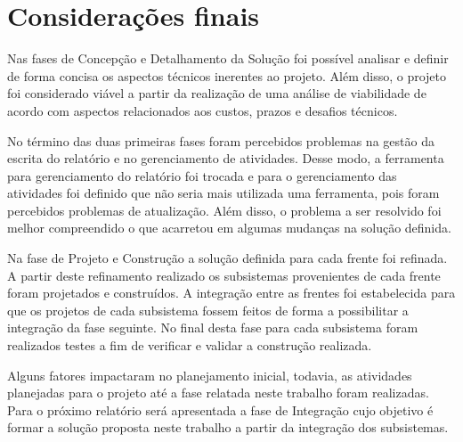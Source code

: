 \chapter{Considerações finais}




Nas fases de Concepção e Detalhamento da Solução foi possível analisar e definir de forma concisa os aspectos técnicos inerentes 
ao projeto. Além disso, o projeto foi considerado viável a partir da realização de uma 
análise de viabilidade de acordo com aspectos relacionados aos custos, prazos e desafios técnicos.

No término das duas primeiras fases foram percebidos problemas na gestão da escrita do relatório e no gerenciamento de atividades. Desse modo, a ferramenta para gerenciamento do relatório foi trocada e para o gerenciamento das atividades foi definido que não seria mais utilizada uma ferramenta, pois foram percebidos problemas de atualização. Além disso, o problema a ser resolvido foi melhor compreendido o que acarretou 
em algumas mudanças na solução definida.

Na fase de Projeto e Construção a solução definida para cada frente foi refinada. A partir deste refinamento 
realizado os subsistemas provenientes de cada frente foram projetados e construídos. 
A integração entre as frentes foi estabelecida para que os projetos de cada subsistema 
fossem feitos de forma a possibilitar a integração da fase seguinte. No final desta fase para cada subsistema foram realizados
testes a fim de verificar e validar a construção realizada. 

Alguns fatores impactaram no planejamento inicial, todavia, as atividades planejadas para o projeto até a fase relatada neste trabalho foram realizadas. 
Para o próximo relatório será apresentada a fase de Integração cujo objetivo é formar a solução proposta neste trabalho a partir da integração
dos subsistemas.

% 
